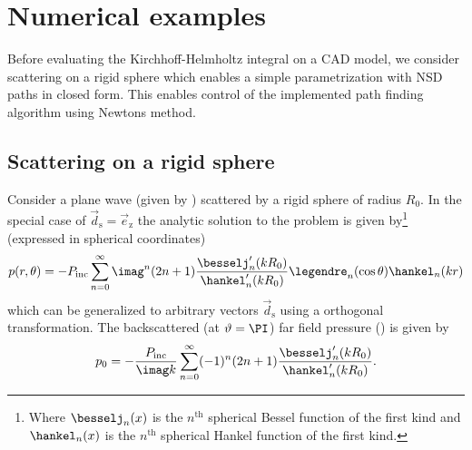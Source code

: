 \section{Numerical examples}
Before evaluating the Kirchhoff-Helmholtz integral on a CAD model, we consider scattering on a rigid sphere which enables a simple parametrization with NSD paths in closed form. This enables control of the implemented path finding algorithm using Newtons method.

\label{Sec4:resultsAndDiscussion}
\subsection{Scattering on a rigid sphere}
Consider a plane wave (given by ) scattered by a rigid sphere of radius $R_0$. In the special case of $\vec{d}_{\mathrm{s}}=\vec{e}_{\mathrm{z}}$ the analytic solution \cite{Venas2019e3s} to the problem is given by\footnote{Where $\besselj_n(x)$ is the $n^{\mathrm{th}}$ spherical Bessel function of the first kind and $\hankel_n(x)$ is the $n^{\mathrm{th}}$ spherical Hankel function of the first kind.} (expressed in spherical coordinates)
\begin{equation}\label{Eq4:analyticSolution}
	p(r,\theta) = -P_{\mathrm{inc}}\sum_{n=0}^\infty \imag^n (2n+1) \frac{\besselj_n'(kR_0)}{\hankel_n'(kR_0)} \legendre_n(\cos\theta)\hankel_n(kr)
\end{equation}
which can be generalized to arbitrary vectors $\vec{d}_{\mathrm{s}}$ using a orthogonal transformation. The backscattered (at $\vartheta=\PI$) far field pressure () is given by
\begin{equation}\label{Eq4:backscatteredSolution}
	p_0 = -\frac{P_{\mathrm{inc}}}{\imag k}\sum_{n=0}^\infty (-1)^n (2n+1) \frac{\besselj_n'(kR_0)}{\hankel_n'(kR_0)}.
\end{equation}

%

